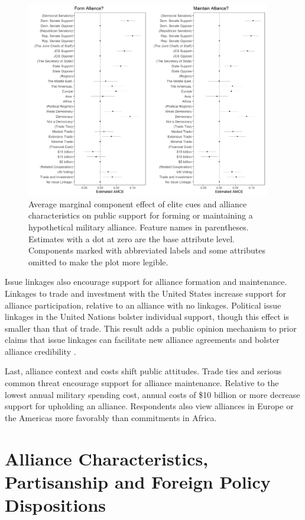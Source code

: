 \documentclass[12pt]{article}
\begin{document}
\begin{figure}
	\centering
		\includegraphics[width=0.95\textwidth]{joint-amce-plots.png}
	\caption{Average marginal component effect of elite cues and alliance characteristics on public support for forming or maintaining a hypothetical military alliance. Feature names in parentheses. Estimates with a dot at zero are the base attribute level. Components marked with abbreviated labels and some attributes omitted to make the plot more legible.}
	\label{fig:joint-plot}
\end{figure}



Issue linkages also encourage support for alliance formation and maintenance. 
Linkages to trade and investment with the United States increase support for alliance participation, relative to an alliance with no linkages. 
Political issue linkages in the United Nations bolster individual support, though this effect is smaller than that of trade. 
This result adds a public opinion mechanism to prior claims that issue linkages can facilitate new alliance agreements \citep{Poast2012} and bolster alliance credibility \citep{Poast2013}. 


Last, alliance context and costs shift public attitudes. 
Trade ties and serious common threat encourage support for alliance maintenance. 
Relative to the lowest annual military spending cost, annual costs of \$10 billion or more decrease support for upholding an alliance.  
Respondents also view alliances in Europe or the Americas more favorably than commitments in Africa. 

\section{Alliance Characteristics, Partisanship and Foreign Policy Dispositions}
\end{document}
